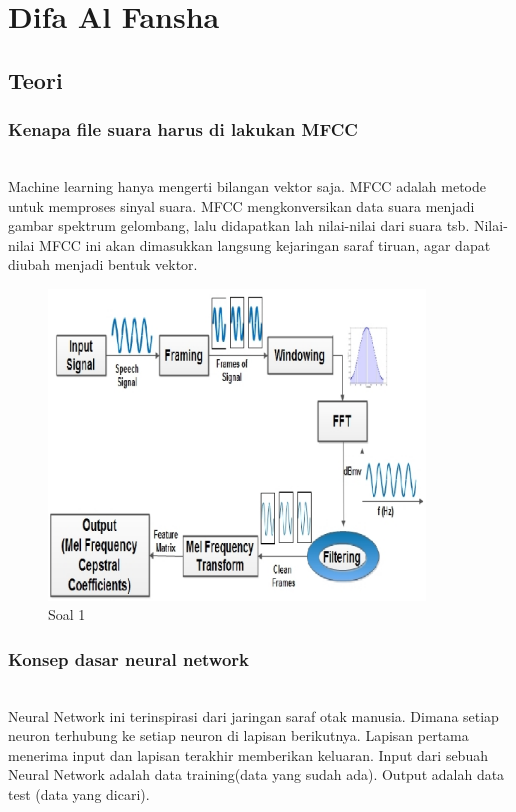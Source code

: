 \section{Difa Al Fansha}

\subsection{Teori}
	\subsubsection{Kenapa file suara harus di lakukan MFCC}
	\hfill\\
Machine learning hanya mengerti bilangan vektor saja. MFCC adalah metode untuk memproses sinyal suara. MFCC mengkonversikan data suara menjadi gambar spektrum gelombang, lalu didapatkan lah nilai-nilai dari suara tsb. Nilai-nilai MFCC ini akan dimasukkan langsung kejaringan saraf tiruan, agar dapat diubah menjadi bentuk vektor.
	
	\begin{figure}[H]
		\begin{center}
		 \includegraphics[width=10cm]{figures/1174076/figures6/teori1.png}
		 \caption{Soal 1}	
		\end{center}
	\end{figure}

	\subsubsection{Konsep dasar neural network}
	\hfill\\
Neural Network ini terinspirasi dari jaringan saraf otak manusia. Dimana setiap neuron terhubung ke setiap neuron di lapisan berikutnya. Lapisan pertama menerima input dan lapisan terakhir memberikan keluaran. Input dari sebuah Neural Network adalah data training(data yang sudah ada). Output adalah data test (data yang dicari).
	
